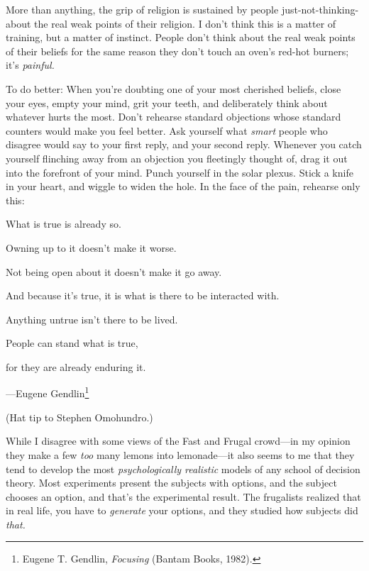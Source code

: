 {
 More than anything, the grip of religion is sustained by people
just-not-thinking-about the real weak points of their religion. I
don't think this is a matter of training, but a matter
of instinct. People don't think about the real weak
points of their beliefs for the same reason they don't
touch an oven's red-hot burners; it's
\textit{painful.}}

{
 To do better: When you're doubting one of your
most cherished beliefs, close your eyes, empty your mind, grit your
teeth, and deliberately think about whatever hurts the most.
Don't rehearse standard objections whose standard
counters would make you feel better. Ask yourself what \textit{smart}
people who disagree would say to your first reply, and your second
reply. Whenever you catch yourself flinching away from an objection you
fleetingly thought of, drag it out into the forefront of your mind.
Punch yourself in the solar plexus. Stick a knife in your heart, and
wiggle to widen the hole. In the face of the pain, rehearse only this:}

{
 What is true is already so.}

{
 Owning up to it doesn't make it worse.}

{
 Not being open about it doesn't make it go away.}

{
 And because it's true, it is what is there to be
interacted with.}

{
 Anything untrue isn't there to be lived.}

{
 People can stand what is true,}

{
 for they are already enduring it.}

{\raggedleft
 {}---Eugene Gendlin\footnote{Eugene T. Gendlin, \textit{Focusing} (Bantam Books, 1982).}
\par}


\bigskip

{
 (Hat tip to Stephen Omohundro.)}

\myendsectiontext


\bigskip


{
 While I disagree with some views of the Fast and Frugal crowd---in
my opinion they make a few \textit{too} many lemons into lemonade---it
also seems to me that they tend to develop the most
\textit{psychologically realistic} models of any school of decision
theory. Most experiments present the subjects with options, and the
subject chooses an option, and that's the experimental
result. The frugalists realized that in real life, you have to
\textit{generate} your options, and they studied how subjects did
\textit{that.} }

